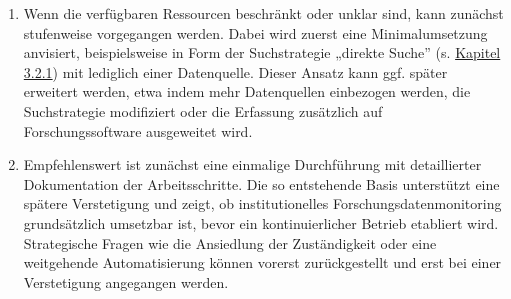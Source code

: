 \documentclass[
  ngerman,
  letterpaper,
  DIV=11]{scrreprt}
\providecommand{\tightlist}{%
  \setlength{\itemsep}{0pt}\setlength{\parskip}{0pt}}
\begin{document}
\begin{enumerate}
\def\labelenumi{\arabic{enumi}.}
\tightlist
\item
  Wenn die verfügbaren Ressourcen beschränkt oder unklar sind, kann
  zunächst stufenweise vorgegangen werden. Dabei wird zuerst eine
  Minimalumsetzung anvisiert, beispielsweise in Form der Suchstrategie
  „direkte Suche'' (s. \hyperref[direkte-suche]{Kapitel 3.2.1}) mit
  lediglich einer Datenquelle. Dieser Ansatz kann ggf. später erweitert
  werden, etwa indem mehr Datenquellen einbezogen werden, die
  Suchstrategie modifiziert oder die Erfassung zusätzlich auf
  Forschungssoftware ausgeweitet wird.
\item
  Empfehlenswert ist zunächst eine einmalige Durchführung mit
  detaillierter Dokumentation der Arbeitsschritte. Die so entstehende
  Basis unterstützt eine spätere Verstetigung und zeigt, ob
  institutionelles Forschungsdatenmonitoring grundsätzlich umsetzbar
  ist, bevor ein kontinuierlicher Betrieb etabliert wird. Strategische
  Fragen wie die Ansiedlung der Zuständigkeit oder eine weitgehende
  Automatisierung können vorerst zurückgestellt und erst bei einer
  Verstetigung angegangen werden.
\end{enumerate}
\end{document}
